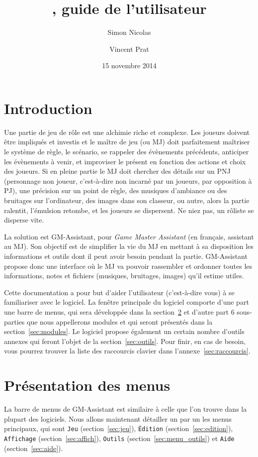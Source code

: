 \documentclass[a4paper,12pt]{article}
\title{\GMA \versionnumber, guide de l'utilisateur}
\author{Simon Nicolas \and Vincent Prat}
\date{15 novembre 2014}
\newcommand*{\GMA}{GM-Assistant\xspace}
\newcommand*{\interfaceitem}[1]{\texttt{#1}}
\begin{document}
\maketitle

\tableofcontents

\section{Introduction}

Une partie de jeu de rôle est une alchimie riche et complexe.
Les joueurs doivent être impliqués et investis et le maître de jeu (ou MJ) doit parfaitement maîtriser le système de règle, le scénario, se rappeler des évènements précédents, anticiper les évènements à venir, et improviser le présent en fonction des actions et choix des joueurs.
Si en pleine partie le MJ doit chercher des détails sur un PNJ (personnage non joueur, c'est-à-dire non incarné par un joueurs, par opposition à PJ), une précision sur un point de règle, des musiques d'ambiance ou des bruitages sur l'ordinateur, des images dans son classeur, ou autre, alors la partie ralentit, l'émulsion retombe, et les joueurs se dispersent.
Ne niez pas, un rôliste se disperse vite.

La solution est \GMA, pour \emph{Game Master Assistant} (en français, assistant au MJ).
Son objectif est de simplifier la vie du MJ en mettant à sa disposition les informations et outils dont il peut avoir besoin pendant la partie.
\GMA propose donc une interface où le MJ va pouvoir rassembler et ordonner toutes les informations, notes et fichiers (musiques, bruitages, images) qu'il estime utiles.

Cette documentation a pour but d'aider l'utilisateur (c'est-à-dire vous) à se familiariser avec le logiciel.
La fenêtre principale du logiciel comporte d'une part une barre de menus, qui sera développée dans la section~\ref{menu} et d'autre part 6 sous-parties que nous appellerons modules et qui seront présentés dans la section~\ref{sec:modules}.
Le logiciel propose également un certain nombre d'outils annexes qui feront l'objet de la section~\ref{sec:outils}.
Pour finir, en cas de besoin, vous pourrez trouver la liste des raccourcis clavier dans l'annexe~\ref{sec:raccourcis}. 

\section{Présentation des menus}
\label{menu}

La barre de menus de \GMA est similaire à celle que l'on trouve dans la plupart des logiciels.
Nous allons maintenant détailler un par un les menus principaux, qui sont \interfaceitem{Jeu} (section~\ref{sec:jeu}), \interfaceitem{Édition} (section~\ref{sec:edition}), \interfaceitem{Affichage} (section~\ref{sec:affich}), \interfaceitem{Outils} (section~\ref{sec:menu_outils}) et \interfaceitem{Aide} (section~\ref{sec:aide}).
\end{document}
